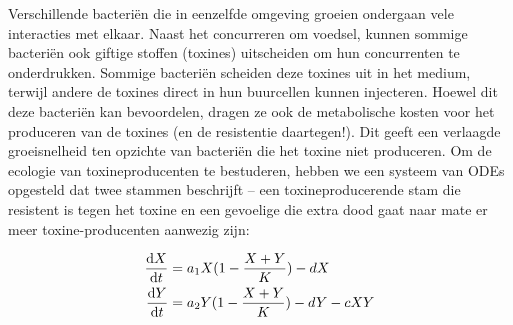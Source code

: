 \documentclass[
  letterpaper,
  DIV=11,
  numbers=noendperiod]{scrartcl}
\begin{document}
\begin{tcolorbox}[enhanced jigsaw, opacityback=0, titlerule=0mm, colback=white, leftrule=.75mm, coltitle=black, colbacktitle=quarto-callout-caution-color!10!white, toprule=.15mm, rightrule=.15mm, bottomrule=.15mm, left=2mm, colframe=quarto-callout-caution-color-frame, arc=.35mm, title=\textcolor{quarto-callout-caution-color}{\faFire}\hspace{0.5em}{Computerpracticum over toxine-productie}, breakable, toptitle=1mm, bottomtitle=1mm, opacitybacktitle=0.6]

Verschillende bacteriën die in eenzelfde omgeving groeien ondergaan vele
interacties met elkaar. Naast het concurreren om voedsel, kunnen sommige
bacteriën ook giftige stoffen (toxines) uitscheiden om hun concurrenten
te onderdrukken. Sommige bacteriën scheiden deze toxines uit in het
medium, terwijl andere de toxines direct in hun buurcellen kunnen
injecteren. Hoewel dit deze bacteriën kan bevoordelen, dragen ze ook de
metabolische kosten voor het produceren van de toxines (en de
resistentie daartegen!). Dit geeft een verlaagde groeisnelheid ten
opzichte van bacteriën die het toxine niet produceren. Om de ecologie
van toxineproducenten te bestuderen, hebben we een systeem van ODEs
opgesteld dat twee stammen beschrijft -- een toxineproducerende stam die
resistent is tegen het toxine en een gevoelige die extra dood gaat naar
mate er meer toxine-producenten aanwezig zijn:

\begin{align}

\mathchoice{\frac{\mathrm{d}X}
{\mathrm{d}t}}{\mathrm{d}X/\mathrm{d}t}
{\mathrm{d}X/\mathrm{d}t}
{\mathrm{d}X/\mathrm{d}t}
 &= a_{1}X(1-\frac{X+Y}{K}) - dX \\

\mathchoice{\frac{\mathrm{d}Y}
{\mathrm{d}t}}{\mathrm{d}Y/\mathrm{d}t}
{\mathrm{d}Y/\mathrm{d}t}
{\mathrm{d}Y/\mathrm{d}t}
 &= a_{2}Y(1-\frac{X+Y}{K}) - dY - cXY
\end{align}


\end{tcolorbox}
\end{document}
